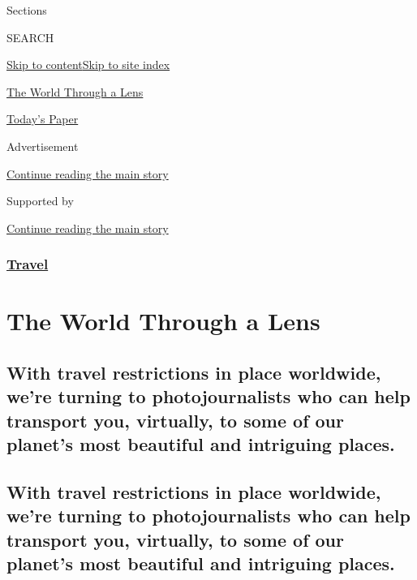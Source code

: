 Sections

SEARCH

\protect\hyperlink{site-content}{Skip to
content}\protect\hyperlink{site-index}{Skip to site index}

\href{https://www.nytimes3xbfgragh.onion/column/the-world-through-a-lens}{The
World Through a Lens}

\href{https://myaccount.nytimes3xbfgragh.onion/auth/login?response_type=cookie\&client_id=vi}{}

\href{https://www.nytimes3xbfgragh.onion/section/todayspaper}{Today's
Paper}

Advertisement

\protect\hyperlink{after-top}{Continue reading the main story}

Supported by

\protect\hyperlink{after-sponsor}{Continue reading the main story}

\hypertarget{travel}{%
\subsubsection{\texorpdfstring{\href{/section/travel}{Travel}}{Travel}}\label{travel}}

\hypertarget{the-world-through-a-lens}{%
\section{The World Through a Lens}\label{the-world-through-a-lens}}

\hypertarget{with-travel-restrictions-in-place-worldwide-were-turning-to-photojournalists-who-can-help-transport-you-virtually-to-some-of-our-planets-most-beautiful-and-intriguing-places}{%
\subsection{With travel restrictions in place worldwide, we're turning
to photojournalists who can help transport you, virtually, to some of
our planet's most beautiful and intriguing
places.}\label{with-travel-restrictions-in-place-worldwide-were-turning-to-photojournalists-who-can-help-transport-you-virtually-to-some-of-our-planets-most-beautiful-and-intriguing-places}}

\hypertarget{with-travel-restrictions-in-place-worldwide-were-turning-to-photojournalists-who-can-help-transport-you-virtually-to-some-of-our-planets-most-beautiful-and-intriguing-places-1}{%
\subsection{With travel restrictions in place worldwide, we're turning
to photojournalists who can help transport you, virtually, to some of
our planet's most beautiful and intriguing
places.}\label{with-travel-restrictions-in-place-worldwide-were-turning-to-photojournalists-who-can-help-transport-you-virtually-to-some-of-our-planets-most-beautiful-and-intriguing-places-1}}

